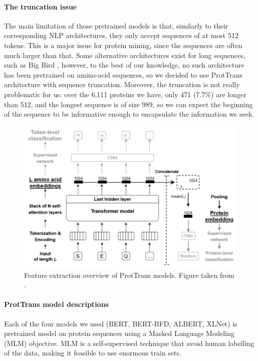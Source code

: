 \documentclass[final]{cvpr}
\begin{document}
\paragraph{The truncation issue} The main limitation of those pretrained models is that, similarly to their corresponding NLP architectures, they only accept sequences of at most 512 tokens. This is a major issue for protein mining, since the sequences are often much larger than that. Some alternative architectures exist for long sequences, such as Big Bird \cite{bigBird2020}, however, to the best of our knowledge, no such architecture has been pretrained on amino-acid sequences, so we decided to use ProtTrans architecture with sequence truncation. Moreover, the truncation is not really problematic for us: over the 6,111 proteins we have, only 471 (7.7\%) are longer than 512, and the longest sequence is of size 989, so we can expect the beginning of the sequence to be informative enough to encapsulate the information we seek. 

\begin{figure}[h]
    \centering
    \includegraphics[width=\columnwidth]{figures/protbertTransformer.png}
    \caption{Feature extraction overview of ProtTrans models. Figure taken from \cite{protTrans}.}
    \label{fig:protTrans}
\end{figure}

\paragraph{ProtTrans model descriptions} Each of the four models we used (BERT, BERT-BFD, ALBERT, XLNet) is pretrained model on protein sequences using a Masked Language Modeling (MLM) objective. MLM is a self-supervised technique that avoid human labelling of the data, making it feasible to use enormous train sets. 
\end{document}
